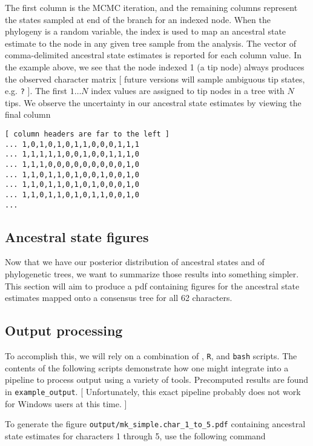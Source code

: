 The first column is the MCMC iteration, and the remaining columns represent the states sampled at end of the branch for an indexed node.
When the phylogeny is a random variable, the index is used to map an ancestral state estimate to the node in any given tree sample from the analysis.
The vector of comma-delimited ancestral state estimates is reported for each column value.
In the example above, we see that the node indexed 1 (a tip node) always produces the observed character matrix [ future versions will sample ambiguous tip states, e.g. {\tt ?} ].
The first $1 \ldots N$ index values are assigned to tip nodes in a tree with $N$ tips.
We observe the uncertainty in our ancestral state estimates by viewing the final column

{\tt \begin{snugshade*}
\begin{lstlisting}
[ column headers are far to the left ]
... 1,0,1,0,1,0,1,1,0,0,0,1,1,1
... 1,1,1,1,1,0,0,1,0,0,1,1,1,0
... 1,1,1,0,0,0,0,0,0,0,0,0,1,0
... 1,1,0,1,1,0,1,0,0,1,0,0,1,0
... 1,1,0,1,1,0,1,0,1,0,0,0,1,0
... 1,1,0,1,1,0,1,0,1,1,0,0,1,0
...
\end{lstlisting}
\end{snugshade*}}

\subsection{Ancestral state figures}

Now that we have our posterior distribution of ancestral states and of phylogenetic trees, we want to summarize those results into something simpler.
This section will aim to produce a pdf containing figures for the ancestral state estimates mapped onto a consensus tree for all 62 characters.

\subsection{Output processing}

To accomplish this, we will rely on a combination of \RevBayes, {\tt R}, and {\tt bash} scripts.
The contents of the following scripts demonstrate how one might integrate \RevBayes into a pipeline to process output using a variety of tools.
Precomputed results are found in {\tt example\_output}.
[ Unfortunately, this exact pipeline probably does not work for Windows users at this time. ]

To generate the figure {\tt output/mk\_simple.char\_1\_to\_5.pdf} containing ancestral state estimates for characters 1 through 5, use the following command

